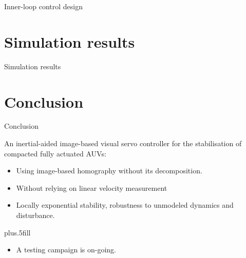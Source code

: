 \documentclass{beamer}
\begin{document}
\begin{frame}{Inner-loop control design}
\end{frame}

\section{Simulation results}
\begin{frame}{Simulation results}
\end{frame}



\section{Conclusion}

\begin{frame}{Conclusion}

  An inertial-aided image-based visual servo controller for the stabilisation of compacted fully actuated AUVs:
  \begin{itemize}
  \item
    Using image-based homography without its decomposition.
  \item
    Without relying on linear velocity measurement
  \item
    Locally exponential stability, robustness to unmodeled dynamics and disturbance.
  \end{itemize}
  
  \vskip0pt plus.5fill
  \begin{itemize}
  \item
    A testing campaign is on-going.    
  \end{itemize}
\end{frame}


\begin{frame}

\end{frame}
\end{document}
